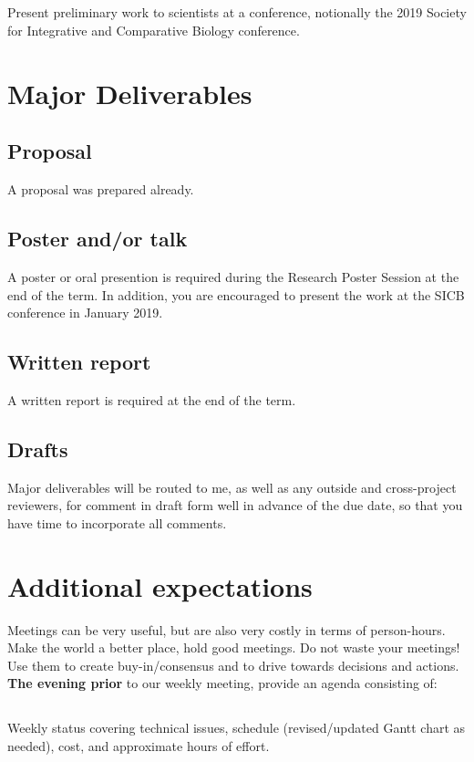 \documentclass[10pt,courier]{navymemo}
\begin{document}
\subsection{} Present preliminary work to scientists at a conference, notionally the 2019 Society for Integrative and Comparative Biology conference.

\section{Major Deliverables}
\subsection{Proposal} A proposal was prepared already. 
\subsection{Poster and/or talk} A poster or oral presention is required during the Research Poster Session at the end of the term. In addition, you are encouraged to present the work at the SICB conference in January 2019. 
\subsection{Written report} A written report is required at the end of the term. 
\subsection{Drafts} Major deliverables will be routed to me, as well as any outside and cross-project reviewers, for comment in draft form well in advance of the due date, so that you have time to incorporate all comments. 

\section{Additional expectations}  Meetings can be very useful, but are also very costly in terms of person-hours.  Make the world a better place, hold good meetings.  Do not waste your meetings! Use them to create buy-in/consensus and to drive towards decisions and actions.  \textbf{The evening prior} to our weekly meeting, provide an agenda consisting of:
\subsection{} Weekly status covering technical issues, schedule (revised/updated Gantt chart as needed), cost, and approximate hours of effort. 
\end{document}
